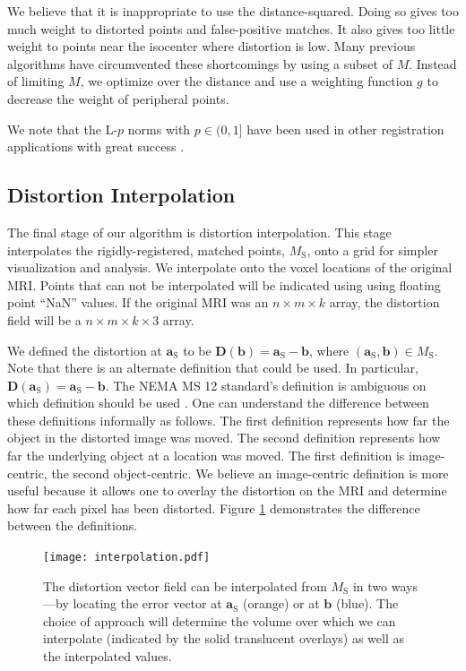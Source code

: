 \documentclass[12pt]{article}
\begin{document}
We believe that it is inappropriate to use the distance-squared.  Doing so gives too much weight to distorted points and false-positive matches.  It also gives too little weight to points near the isocenter where distortion is low.  Many previous algorithms have circumvented these shortcomings by using a subset of $M$.  Instead of limiting $M$, we optimize over the distance and use a weighting function $g$ to decrease the weight of peripheral points.

We note that the L-$p$ norms with $p \in (0, 1]$ have been used in other registration applications with great success \cite{bouaziz2013}.

\subsection{Distortion Interpolation}

The final stage of our algorithm is distortion interpolation.  This stage interpolates the rigidly-registered, matched points, $M_\textrm{S}$, onto a grid for simpler visualization and analysis.  We interpolate onto the voxel locations of the original MRI.  Points that can not be interpolated will be indicated using using floating point ``NaN'' values.  If the original MRI was an $n \times m \times k$ array, the distortion field will be a $n \times m \times k \times 3$ array.

We defined the distortion at $\mathbf{a}_\textrm{S}$ to be $\mathbf{D}(\mathbf{b}) = \mathbf{a}_\textrm{S} - \mathbf{b}$, where $(\mathbf{a}_\textrm{S}, \mathbf{b}) \in M_\textrm{S}$.  Note that there is an alternate definition that could be used.  In particular, $\mathbf{D}(\mathbf{a}_\textrm{S}) = \mathbf{a}_\textrm{S} - \mathbf{b}$.  The NEMA MS 12 standard's definition is ambiguous on which definition should be used \cite{nema2010}.  One can understand the difference between these definitions informally as follows.  The first definition represents how far the object in the distorted image was moved.  The second definition represents how far the underlying object at a location was moved.  The first definition is image-centric, the second object-centric.  We believe an image-centric definition is more useful because it allows one to overlay the distortion on the MRI and determine how far each pixel has been distorted.  Figure \ref{fig:interpolation} demonstrates the difference between the definitions.

\begin{figure}
    \centering
    \texttt{[image: interpolation.pdf]}
    \caption{The distortion vector field can be interpolated from $M_\textrm{S}$ in two ways---by locating the error vector at $\mathbf{a}_\textrm{S}$ (orange) or at $\mathbf{b}$ (blue).  The choice of approach will determine the volume over which we can interpolate (indicated by the solid translucent overlays) as well as the interpolated values.}
    \label{fig:interpolation}
\end{figure}
\end{document}
